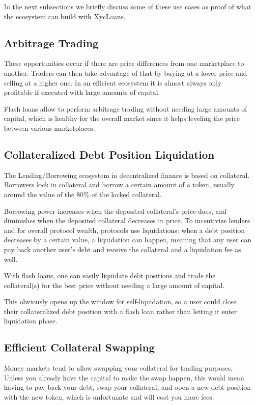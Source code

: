 \documentclass[twocolumn]{article}
\begin{document}
In the next subsections we briefly discuss some of these use cases as proof of what the ecosystem can build with XycLoans.

\subsection{Arbitrage Trading}

These opportunities occur if there are price differences from one marketplace to another. Traders can then take advantage of that by buying at a lower price and selling at a higher one. In an efficient ecosystem it is almost always only profitable if executed with large amounts of capital.

Flash loans allow to perform arbitrage trading without needing large amounts of capital, which is healthy for the overall market since it helps leveling the price between various marketplaces.

\subsection{Collateralized Debt Position Liquidation}
The Lending/Borrowing ecosystem in decentralized finance is based on collateral. Borrowers lock in collateral and borrow a certain amount of a token, usually around the value of the 80\% of the locked collateral.

Borrowing power increases when the deposited collateral's price does, and diminishes when the deposited collateral decreases in price. To incentivize lenders and for overall protocol wealth, protocols use liquidations: when a debt position decreases by a certain value, a liquidation can happen, meaning that any user can pay back another user's debt and receive the collateral and a liquidation fee as well.

With flash loans, one can easily liquidate debt positions and trade the collateral(s) for the best price without needing a large amount of capital.

This obviously opens up the window for self-liquidation, so a user could close their collateralized debt position  with a flash loan rather than letting it enter liquidation phase.

\subsection{Efficient Collateral Swapping}
Money markets tend to allow swapping your collateral for trading purposes. Unless you already have the capital to make the swap happen, this would mean having to pay back your debt, swap your collateral, and open a new debt position with the new token, which is unfortunate and will cost you more fees.
\end{document}
